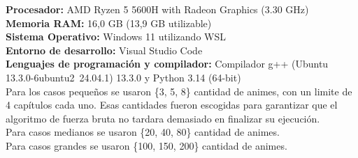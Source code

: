 

\textbf{Procesador:} AMD Ryzen 5 5600H with Radeon Graphics (3.30 GHz) \\
\textbf{Memoria RAM:} 16,0 GB (13,9 GB utilizable) \\
\textbf{Sistema Operativo:} Windows 11 utilizando WSL\\
\textbf{Entorno de desarrollo:} Visual Studio Code\\
\textbf{Lenguajes de programación y compilador:} Compilador g++ (Ubuntu 13.3.0-6ubuntu2~24.04.1) 13.3.0 y Python 3.14 (64-bit) \\


Para los casos pequeños se usaron \{3, 5, 8\} cantidad de animes, con un limite de 4 capítulos cada uno. 
Esas cantidades fueron escogidas para garantizar que el algoritmo de fuerza bruta no tardara demasiado en finalizar su ejecución.
\\
Para casos medianos se usaron \{20, 40, 80\} cantidad de animes.
\\
Para casos grandes se usaron \{100, 150, 200\} cantidad de animes. 





